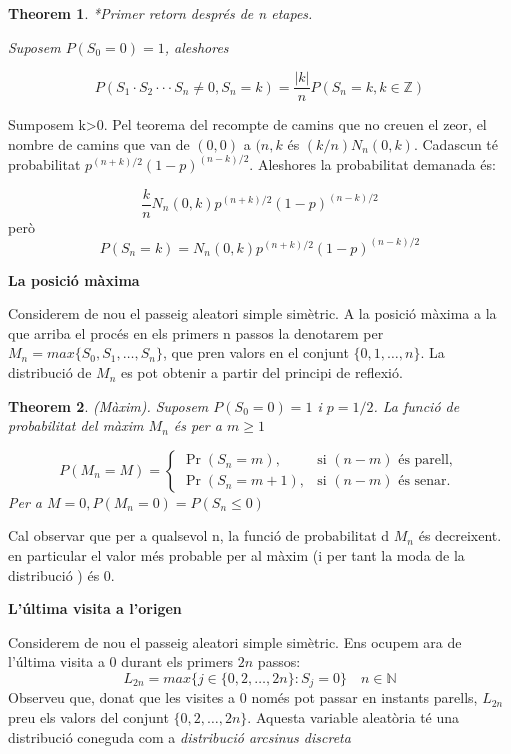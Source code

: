\documentclass[
  catalan,
]{article}
\newtheorem{theorem}{Theorem}[section]
\theoremstyle{definition}
\theoremstyle{definition}
\theoremstyle{definition}
\theoremstyle{definition}
\theoremstyle{remark}
\begin{document}
\begin{theorem}
*Primer retorn després de n etapes.

Suposem \(P(S_0=0)=1\), aleshores

\[
P(S_1·S_2···S_n \neq 0, S_n=k)=\dfrac{|k|}{n} P(S_n=k, k \in \mathbb{Z})
\]
\end{theorem}

Sumposem k\textgreater0. Pel teorema del recompte de camins que no creuen el zeor, el nombre de camins que van de \((0,0)\) a \((n,k\) és \((k/n)N_n(0,k)\). Cadascun té probabilitat \(p^{(n+k)/2} (1-p)^{(n-k)/2}\). Aleshores la probabilitat demanada és:

\[
\dfrac{k}{n} N_n(0,k)p^{(n+k)/2} (1-p)^{(n-k)/2} 
\]
però
\[
P(S_n=k)=N_n(0,k)p^{(n+k)/2} (1-p)^{(n-k)/2}
\]

\textbf{La posició màxima}

Considerem de nou el passeig aleatori simple simètric. A la posició màxima a la que arriba el procés en els primers n passos la denotarem per \(M_n=max\{S_0,S_1,\dots,S_n\}\), que pren valors en el conjunt \(\{0,1,\dots,n \}\). La distribució de \(M_n\) es pot obtenir a partir del principi de reflexió.

\begin{theorem}
\emph{(Màxim)}. Suposem \(P(S_0=0)=1\) i \(p=1/2\). La funció de probabilitat del màxim \(M_n\) és per a \(m\geq 1\)

\[
P(M_n=M)=
\begin{cases}
\Pr(S_n=m), & \text{si } (n-m) \text{ és parell},\\
\Pr(S_n=m+1), & \text{si } (n-m) \text{ és senar}. \end{cases}  \label{eq:posmax} 
\]
Per a \(M=0, P(M_n=0)=P(S_n \leq 0)\)
\end{theorem}

Cal observar que per a qualsevol n, la funció de probabilitat d \(M_n\) és decreixent. en particular el valor més probable per al màxim (i per tant la moda de la distribució ) és 0.

\textbf{L'última visita a l'origen}

Considerem de nou el passeig aleatori simple simètric. Ens ocupem ara de l'última visita a 0 durant els primers \(2n\) passos:
\[
L_{2n}=max\{j \in \{0,2,\dots,2n\}: S_j=0\} \quad n \in \mathbb{N}
\]
Observeu que, donat que les visites a 0 només pot passar en instants parells, \(L_{2n}\) preu els valors del conjunt \(\{0,2,\dots,2n\}\). Aquesta variable aleatòria té una distribució coneguda com a \emph{distribució arcsinus discreta}
\end{document}
